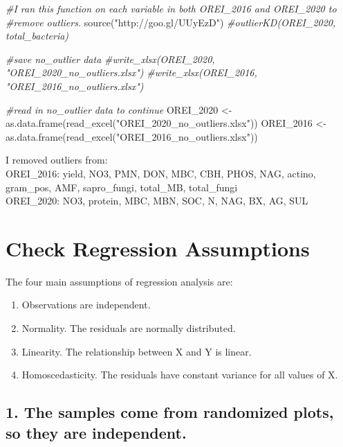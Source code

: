 \documentclass[
]{article}
\newenvironment{Shaded}{\begin{snugshade}}{\end{snugshade}}
\newcommand{\CommentTok}[1]{\textcolor[rgb]{0.56,0.35,0.01}{\textit{#1}}}
\newcommand{\FunctionTok}[1]{\textcolor[rgb]{0.00,0.00,0.00}{#1}}
\newcommand{\NormalTok}[1]{#1}
\newcommand{\OtherTok}[1]{\textcolor[rgb]{0.56,0.35,0.01}{#1}}
\newcommand{\StringTok}[1]{\textcolor[rgb]{0.31,0.60,0.02}{#1}}
\providecommand{\tightlist}{%
  \setlength{\itemsep}{0pt}\setlength{\parskip}{0pt}}
\begin{document}
\begin{Shaded}
\begin{Highlighting}[]
\CommentTok{\#I ran this function on each variable in both OREI\_2016 and OREI\_2020 to }
\CommentTok{\#remove outliers.}
\FunctionTok{source}\NormalTok{(}\StringTok{"http://goo.gl/UUyEzD"}\NormalTok{)}
  \CommentTok{\#outlierKD(OREI\_2020, total\_bacteria)}

\CommentTok{\#save no\_outlier data}
  \CommentTok{\#write\_xlsx(OREI\_2020, "OREI\_2020\_no\_outliers.xlsx")}
  \CommentTok{\#write\_xlsx(OREI\_2016, "OREI\_2016\_no\_outliers.xlsx")}

\CommentTok{\#read in no\_outlier data to continue}
\NormalTok{OREI\_2020 }\OtherTok{\textless{}{-}} \FunctionTok{as.data.frame}\NormalTok{(}\FunctionTok{read\_excel}\NormalTok{(}\StringTok{"OREI\_2020\_no\_outliers.xlsx"}\NormalTok{))}
\NormalTok{OREI\_2016 }\OtherTok{\textless{}{-}} \FunctionTok{as.data.frame}\NormalTok{(}\FunctionTok{read\_excel}\NormalTok{(}\StringTok{"OREI\_2016\_no\_outliers.xlsx"}\NormalTok{))}
\end{Highlighting}
\end{Shaded}

I removed outliers from:\\
OREI\_2016: yield, NO3, PMN, DON, MBC, CBH, PHOS, NAG, actino,
gram\_pos, AMF, sapro\_fungi, total\_MB, total\_fungi\\
OREI\_2020: NO3, protein, MBC, MBN, SOC, N, NAG, BX, AG, SUL

\hypertarget{check-regression-assumptions}{%
\section{Check Regression
Assumptions}\label{check-regression-assumptions}}

The four main assumptions of regression analysis are:

\begin{enumerate}
\def\labelenumi{\arabic{enumi}.}
\tightlist
\item
  Observations are independent.
\item
  Normality. The residuals are normally distributed.
\item
  Linearity. The relationship between X and Y is linear.
\item
  Homoscedasticity. The residuals have constant variance for all values
  of X.
\end{enumerate}

\hypertarget{the-samples-come-from-randomized-plots-so-they-are-independent.}{%
\subsection{1. The samples come from randomized plots, so they are
independent.}\label{the-samples-come-from-randomized-plots-so-they-are-independent.}}
\end{document}
